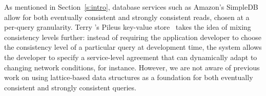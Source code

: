 As mentioned in Section~\ref{s:intro}, database services such as
Amazon's SimpleDB~\cite{simpledb-vogels-article} allow for both
eventually consistent and strongly consistent reads, chosen at a
per-query granularity.  Terry \etal's Pileus key-value
store~\cite{pileus} takes the idea of mixing consistency levels
further: instead of requiring the application developer to choose the
consistency level of a particular query at development time, the
system allows the developer to specify a service-level agreement that
can dynamically adapt to changing network conditions, for instance.
However, we are not aware of previous work on using
lattice-based data structures as a foundation for both eventually
consistent and strongly consistent queries.



